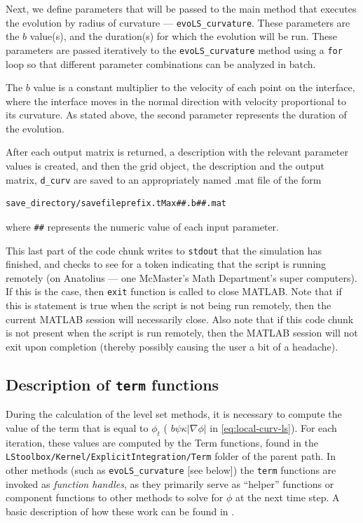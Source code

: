 \documentclass{article}
\begin{document}
Next, we define parameters that will be passed to the main method
that executes the evolution by radius of curvature ---
\texttt{evoLS\_curvature}. These parameters are the $b$ value(s),
and the duration(s) for which the evolution will be run. These
parameters are passed iteratively to the \texttt{evoLS\_curvature}
method using a \texttt{for} loop so that different parameter
combinations can be analyzed in batch. 

The $b$ value is a constant multiplier to the velocity of each
point on the interface, where the interface moves in the normal
direction with velocity proportional to its curvature. As stated
above, the second parameter represents the duration of the
evolution. 

After each output matrix is returned, a description with the
relevant parameter values is created, and then the grid object,
the description and the output matrix, \texttt{d\_curv} are saved
to an appropriately named .mat file of the form 
\begin{verbatim}
save_directory/savefileprefix.tMax##.b##.mat
\end{verbatim}
where \texttt{\#\#} represents the numeric value of each input
parameter. 



This last part of the code chunk writes to \texttt{stdout} that
the simulation has finished, and checks to see for a token
indicating that the script is running remotely (\eg on Anatolius
--- one McMaster's Math Department's super computers). If this is
the case, then \texttt{exit} function is called to close
MATLAB. Note that if this is statement is true when the script is
not being run remotely, then the current MATLAB session will
necessarily close. Also note that if this code chunk is not
present when the script is run remotely, then the MATLAB session
will not exit upon completion (thereby possibly causing the user a
bit of a headache). 

\subsection{Description of \texttt{term} functions}
\label{sec:descr-term-funct}

During the calculation of the level set methods, it is necessary
to compute the value of the term that is equal to $\phi_t$ (\eg
$b\psi\kappa\left|\nabla\phi\right|$ in
\autoref{eq:local-curv-ls}). For each iteration, these values are
computed by the Term functions, found in the
\texttt{LStoolbox/Kernel/ExplicitIntegration/Term} folder of the
parent path. In other methods (such as \texttt{evoLS\_curvature}
[see below]) the \texttt{term} functions are invoked as
\emph{function handles}, as they primarily serve as ``helper''
functions or component functions to other methods to solve for
$\phi$ at the next time step. A basic description of how these
work can be found in \cite{mitchell}.
\end{document}
